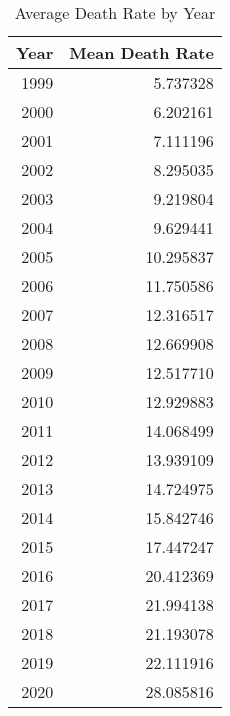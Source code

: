 \begin{table}\centering
\caption{Average Death Rate by Year}
\label{}
\begin{tabular}[t]{r|r}
\hline
Year & Mean Death Rate\\
\hline
1999 & 5.737328\\
\hline
2000 & 6.202161\\
\hline
2001 & 7.111196\\
\hline
2002 & 8.295035\\
\hline
2003 & 9.219804\\
\hline
2004 & 9.629441\\
\hline
2005 & 10.295837\\
\hline
2006 & 11.750586\\
\hline
2007 & 12.316517\\
\hline
2008 & 12.669908\\
\hline
2009 & 12.517710\\
\hline
2010 & 12.929883\\
\hline
2011 & 14.068499\\
\hline
2012 & 13.939109\\
\hline
2013 & 14.724975\\
\hline
2014 & 15.842746\\
\hline
2015 & 17.447247\\
\hline
2016 & 20.412369\\
\hline
2017 & 21.994138\\
\hline
2018 & 21.193078\\
\hline
2019 & 22.111916\\
\hline
2020 & 28.085816\\
\hline
\end{tabular}
\end{table}